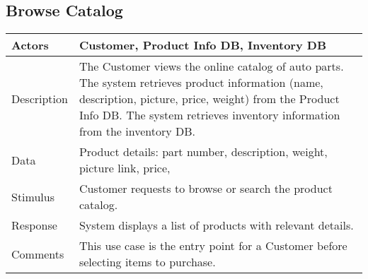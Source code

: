 \documentclass{report}
\begin{document}
    \pagebreak 
    \bigbreak \noindent 
    \subsection{Browse Catalog}
    \bigbreak \noindent 
    \begin{center}
        \begin{tabular}{|p{5cm}|p{8cm}|}
            \hline
            Actors & 
            Customer, Product Info DB, Inventory DB \\
            \hline
            Description & 
            The Customer views the online catalog of auto parts. 
            The system retrieves product information (name, description, 
            picture, price, weight) from the Product Info DB. 
            The system retrieves inventory information from the inventory DB.
             \\
            \hline
            Data & 
            Product details: part number, description, weight, picture link, 
            price, \\
            \hline
            Stimulus & 
            Customer requests to browse or search the product catalog. \\
            \hline
            Response & 
            System displays a list of products with relevant details. \\
            \hline
            Comments & 
            This use case is the entry point for a Customer 
            before selecting items to purchase. \\
            \hline
        \end{tabular}
    \end{center}

    \pagebreak 
\end{document}
